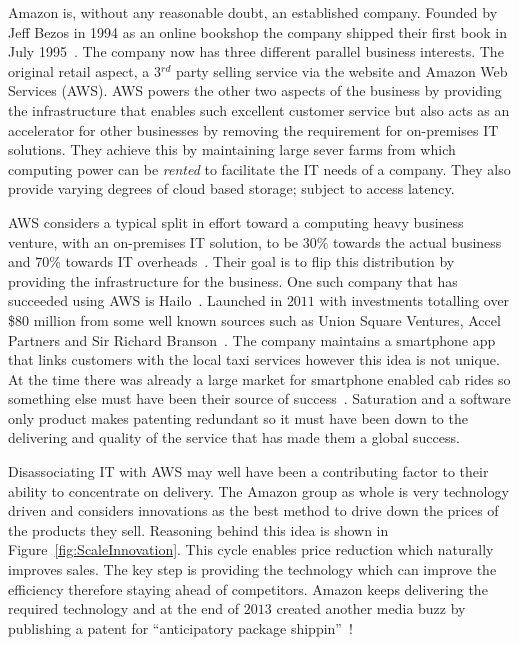 {}






Amazon is, without any reasonable doubt, an established company. 
Founded by Jeff Bezos in 1994 as an online bookshop the company shipped their first book in July 1995~\cite{seattle}. 
The company now has three different parallel business interests. 
The original retail aspect, a 3$^{rd}$ party selling service via the website and Amazon Web Services (AWS).
AWS powers the other two aspects of the business by providing the infrastructure that enables such excellent customer service but also acts as an accelerator for other businesses by removing the requirement for on-premises IT solutions. 
They achieve this by maintaining large sever farms from which computing power can be \emph{rented} to facilitate the IT needs of a company. 
They also provide varying degrees of cloud based storage; subject to access latency.

AWS considers a typical split in effort toward a computing heavy business venture, with an on-premises IT solution, to be $30\%$ towards the actual business and $70\%$ towards IT overheads~\cite{gavin2014ams}. 
Their goal is to flip this distribution by providing the infrastructure for the business. 
One such company that has succeeded using AWS is Hailo~\cite{gavin2014ams}. 
Launched in $2011$ with investments totalling over \$$80$ million from some well known sources such as Union Square Ventures, Accel Partners and Sir Richard Branson~\cite{hailo}.
The company maintains a smartphone app that links customers with the local taxi services however this idea is not unique. 
At the time there was already a large market for smartphone enabled cab rides so something else must have been their source of success~\cite{ventureBeat}. 
Saturation and a software only product makes patenting redundant so it must have been down to the delivering and quality of the service that has made them a global success. 

Disassociating IT with AWS may well have been a contributing factor to their ability to concentrate on delivery.
The Amazon group as whole is very technology driven and considers innovations as the best method to drive down the prices of the products they sell. Reasoning behind this idea is shown in Figure~\ref{fig:ScaleInnovation}.
This cycle enables price reduction which naturally improves sales. 
The key step is providing the technology which can improve the efficiency therefore staying ahead of competitors. 
Amazon keeps delivering the required technology and at the end of $2013$ created another media buzz by publishing a patent for ``anticipatory package shippin''~\cite{spiegel2013method}!



